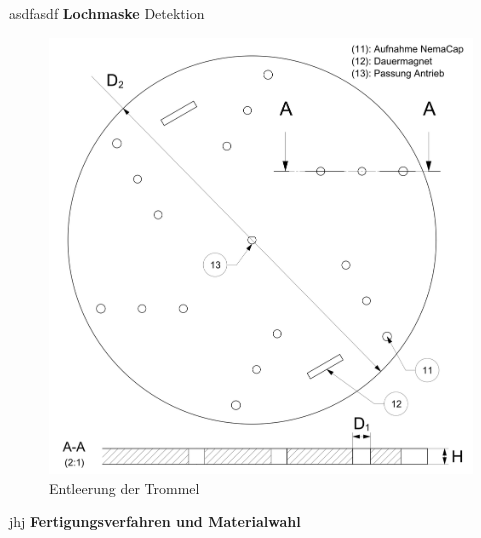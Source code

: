 asdfasdf
\newline
\textbf{Lochmaske}
\newline
Detektion
	\begin{figure}[H]
	\includegraphics[scale=0.63]{Illustrationen/6-Umsetzung/detail_lochmaske.jpg}
	\caption{Entleerung der Trommel}
	\label{fig:detail_lochmaske}
	\end{figure}
jhj
\newline
\textbf{Fertigungsverfahren und Materialwahl}
\newline